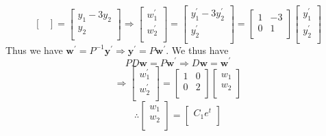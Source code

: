 \begin{longsolution}
\[\begin{bmatrix}
    \end{bmatrix} = \begin{bmatrix}
        y_1 - 3y_2  \\
         y_2   \\
    \end{bmatrix} \Longrightarrow \begin{bmatrix}
         w_1^{\prime}  \\
          w_2^{\prime} \\
    \end{bmatrix} = \begin{bmatrix}
         y_1^{\prime} -3y_2^{\prime}  \\
          y_2^{\prime} \\
    \end{bmatrix} = \begin{bmatrix}
        1 &-3   \\
         0&1   \\
    \end{bmatrix} \begin{bmatrix}
         y_1^{\prime}  \\
          y_2^{\prime} \\
    \end{bmatrix}
\]
Thus we have \(\mathbf{w} ^{\prime}  = P ^{-1} \mathbf{y} ^{\prime} \Longrightarrow \mathbf{y} ^{\prime} =P \mathbf{w}^{\prime} \). We thus have
\[
    PD \mathbf{w} =P \mathbf{w} ^{\prime}  \Longrightarrow D \mathbf{w} = \mathbf{w} ^{\prime} 
\]
\[
    \Longrightarrow \begin{bmatrix}
         w_1^{\prime}  \\
          w_2^{\prime} \\
    \end{bmatrix} = \begin{bmatrix}
        1 &0   \\
         0&2   \\
    \end{bmatrix} \begin{bmatrix}
         w_1 \\
          w_2\\
    \end{bmatrix}
\]
\[
    \therefore \begin{bmatrix}
         w_1 \\
          w_2\\
    \end{bmatrix}=\begin{bmatrix}
         C_1 e^t \\

\end{bmatrix}\]
\end{longsolution}
